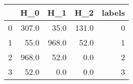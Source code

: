 \begin{tabular}{lrrrr}
\toprule
{} &    H\_0 &    H\_1 &    H\_2 &  labels \\
\midrule
0 &  307.0 &   35.0 &  131.0 &       0 \\
1 &   55.0 &  968.0 &   52.0 &       1 \\
2 &  968.0 &   52.0 &    0.0 &       2 \\
3 &   52.0 &    0.0 &    0.0 &       3 \\
\bottomrule
\end{tabular}
